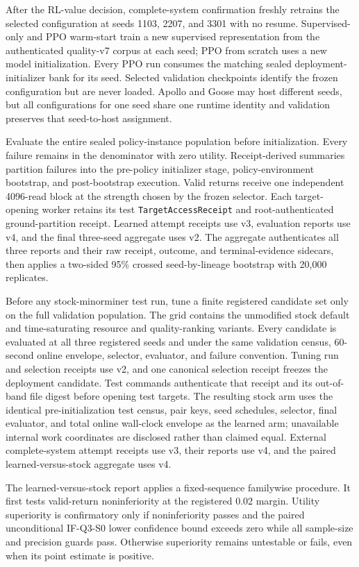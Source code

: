 After the RL-value decision, complete-system confirmation freshly retrains the selected configuration at seeds 1103, 2207, and 3301 with no resume. Supervised-only and PPO warm-start train a new supervised representation from the authenticated quality-v7 corpus at each seed; PPO from scratch uses a new model initialization. Every PPO run consumes the matching sealed deployment-initializer bank for its seed. Selected validation checkpoints identify the frozen configuration but are never loaded. Apollo and Goose may host different seeds, but all configurations for one seed share one runtime identity and validation preserves that seed-to-host assignment.

Evaluate the entire sealed policy-instance population before initialization. Every failure remains in the denominator with zero utility. Receipt-derived summaries partition failures into the pre-policy initializer stage, policy-environment bootstrap, and post-bootstrap execution. Valid returns receive one independent 4096-read block at the strength chosen by the frozen selector. Each target-opening worker retains its test \texttt{TargetAccessReceipt} and root-authenticated ground-partition receipt. Learned attempt receipts use v3, evaluation reports use v4, and the final three-seed aggregate uses v2. The aggregate authenticates all three reports and their raw receipt, outcome, and terminal-evidence sidecars, then applies a two-sided 95\% crossed seed-by-lineage bootstrap with 20,000 replicates.

Before any stock-minorminer test run, tune a finite registered candidate set only on the full validation population. The grid contains the unmodified stock default and time-saturating resource and quality-ranking variants. Every candidate is evaluated at all three registered seeds and under the same validation census, 60-second online envelope, selector, evaluator, and failure convention. Tuning run and selection receipts use v2, and one canonical selection receipt freezes the deployment candidate. Test commands authenticate that receipt and its out-of-band file digest before opening test targets. The resulting stock arm uses the identical pre-initialization test census, pair keys, seed schedules, selector, final evaluator, and total online wall-clock envelope as the learned arm; unavailable internal work coordinates are disclosed rather than claimed equal. External complete-system attempt receipts use v3, their reports use v4, and the paired learned-versus-stock aggregate uses v4.

The learned-versus-stock report applies a fixed-sequence familywise procedure. It first tests valid-return noninferiority at the registered 0.02 margin. Utility superiority is confirmatory only if noninferiority passes and the paired unconditional IF-Q3-S0 lower confidence bound exceeds zero while all sample-size and precision guards pass. Otherwise superiority remains untestable or fails, even when its point estimate is positive.

